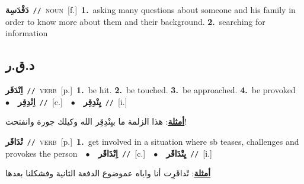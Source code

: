 \documentclass[10pt,a4paper,twoside]{article} %
\begin{document}
\begin{multicols}{2}
{\setlength\topsep{0pt}\textbf{\foreignlanguage{arabic}{دَقْدَسِة}}\ {\color{gray}\texttt{//}\color{black}}\ \textsc{noun}\ [f.]\ \textbf{1.}~asking many questions about someone and his family in order to know more about them and their background.  \textbf{2.}~searching for information\ } \vspace{2mm}

\vspace{-3mm}
\subsection*{\color{blue}\foreignlanguage{arabic}{د.ق.ر}\color{blue}{}} 

{\setlength\topsep{0pt}\textbf{\foreignlanguage{arabic}{اِنْدَقَر}}\ {\color{gray}\texttt{//}\color{black}}\ \textsc{verb}\ [p.]\ \textbf{1.}~be hit.  \textbf{2.}~be touched.  \textbf{3.}~be approached.  \textbf{4.}~be provoked\ \ $\bullet$\ \ \setlength\topsep{0pt}\textbf{\foreignlanguage{arabic}{اِنْدِقِر}}\ {\color{gray}\texttt{//}\color{black}}\ [c.]\ \ $\bullet$\ \ \setlength\topsep{0pt}\textbf{\foreignlanguage{arabic}{يِنْدِقِر}}\ {\color{gray}\texttt{//}\color{black}}\ [i.]\  \begin{flushright}\color{gray}\foreignlanguage{arabic}{\textbf{\underline{\foreignlanguage{arabic}{أمثلة}}}: هذا الزلمة ما بيِنْدِقِر الله وكيلك جورة وانفتحت!}\end{flushright}\color{black}} \vspace{2mm}

{\setlength\topsep{0pt}\textbf{\foreignlanguage{arabic}{تْدَاقَر}}\ {\color{gray}\texttt{//}\color{black}}\ \textsc{verb}\ [p.]\ \textbf{1.}~get involved in a situation where sb teases, challenges and provokes the person\ \ $\bullet$\ \ \setlength\topsep{0pt}\textbf{\foreignlanguage{arabic}{اِتْدَاقَر}}\ {\color{gray}\texttt{//}\color{black}}\ [c.]\ \ $\bullet$\ \ \setlength\topsep{0pt}\textbf{\foreignlanguage{arabic}{يِتْدَاقَر}}\ {\color{gray}\texttt{//}\color{black}}\ [i.]\  \begin{flushright}\color{gray}\foreignlanguage{arabic}{\textbf{\underline{\foreignlanguage{arabic}{أمثلة}}}: تْداقَرِت أنا واياه عموضوع الدفعة الثانية وفشكلنا بعدها}\end{flushright}\color{black}} \vspace{2mm}


\end{multicols}
\end{document}
